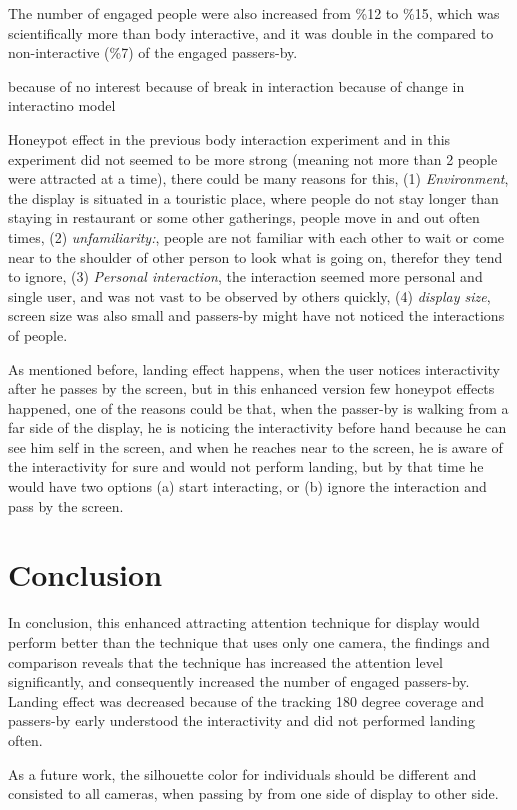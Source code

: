 The number of engaged people were also increased from \%12 to \%15, which was scientifically more than body interactive, and it was double in the compared to non-interactive (\%7) of the engaged passers-by. 


because of no interest
because of break in interaction
because of change in interactino model


Honeypot effect in the previous body interaction experiment and in this experiment did not seemed to be more strong (meaning not more than 2 people were attracted at a time), there could be many reasons for this, (1) \emph{Environment}, the display is situated in a touristic place, where people do not stay longer than staying in restaurant or some other gatherings, people move in and out often times, (2) \emph{unfamiliarity:}, people are not familiar with each other to wait or come near to the shoulder of other person to look what is going on, therefor they tend to ignore, (3) \emph{Personal interaction}, the interaction seemed more personal and single user,  and was not vast to be observed by others quickly, (4) \emph{display size}, screen size was also small and passers-by might have not noticed the interactions of people.


As mentioned before, landing effect happens, when the user notices interactivity after he passes by the screen, but in this enhanced version few honeypot effects happened, one of the reasons could be that, when the passer-by is walking from a far side of the display, he is noticing the interactivity before hand because he can see him self in the screen, and when he reaches near to the screen, he is aware of the interactivity for sure and would not perform landing, but by that time he would have two options (a) start interacting, or (b) ignore the interaction and pass by the screen.



\section{Conclusion}
In conclusion, this enhanced attracting attention technique for display would perform better than the technique that uses only one camera, the findings and comparison reveals that the technique has increased the attention level significantly, and consequently increased the number of engaged passers-by. Landing effect was decreased because of the tracking 180 degree coverage and passers-by early understood the interactivity and did not performed landing often. 

As a future work, the silhouette color for individuals should be different and consisted to all cameras, when passing by from one side of display to other side. 


